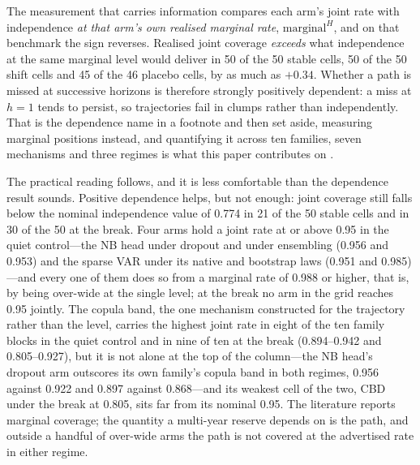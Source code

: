 The measurement that carries information compares each arm's joint rate
with independence \emph{at that arm's own realised marginal rate},
$\text{marginal}^H$, and on that benchmark the sign reverses. Realised
joint coverage \emph{exceeds} what independence at the same marginal
level would deliver in 50 of the 50 stable cells, 50 of the 50 shift
cells and 45 of the 46 placebo cells, by as much as $+0.34$. Whether a
path is missed at successive horizons is therefore strongly positively
dependent: a miss at $h=1$ tends to persist, so trajectories fail in
clumps rather than independently. That is the dependence
\citet{dowd2010backtesting} name in a footnote and then set aside,
measuring marginal positions instead, and quantifying it across ten
families, seven mechanisms and three regimes is what this paper
contributes on \Hthree.

The practical reading follows, and it is less comfortable than the
dependence result sounds. Positive dependence helps, but not enough:
joint coverage still falls below the nominal independence value of 0.774
in 21 of the 50 stable cells and in 30 of the 50 at the break. Four arms
hold a joint rate at or above 0.95 in the quiet control---the NB head
under dropout and under ensembling (0.956 and 0.953) and the sparse VAR
under its native and bootstrap laws (0.951 and 0.985)---and every one of
them does so from a marginal rate of 0.988 or higher, that is, by being
over-wide at the single level; at the break no arm in the grid reaches
0.95 jointly. The copula band, the one mechanism constructed for the
trajectory rather than the level, carries the highest joint rate in eight
of the ten family blocks in the quiet control and in nine of ten at the
break (0.894--0.942 and 0.805--0.927), but it is not alone at the top of
the column---the NB head's dropout arm outscores its own family's copula
band in both regimes, 0.956 against 0.922 and 0.897 against 0.868---and
its weakest cell of the two, CBD under the break at 0.805, sits far from
its nominal 0.95. The literature reports marginal coverage; the quantity
a multi-year reserve depends on is the path, and outside a handful of
over-wide arms the path is not covered at the advertised rate in either
regime.


